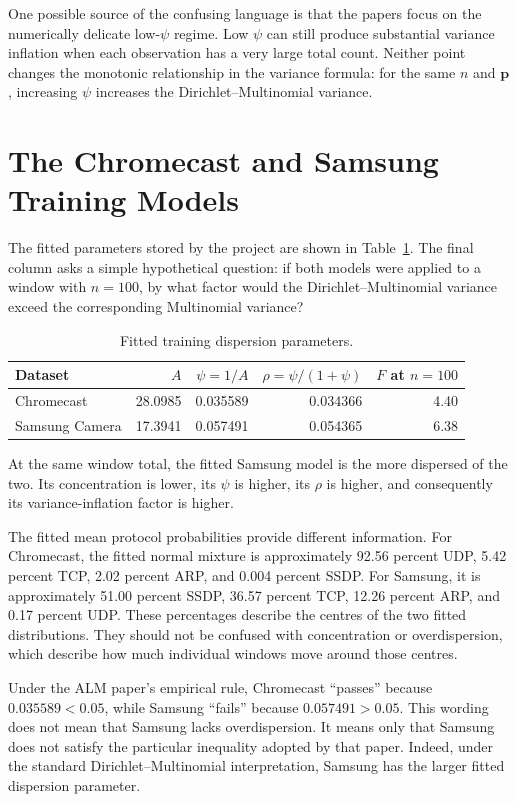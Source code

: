 \documentclass[11pt,a4paper]{article}
\begin{document}
One possible source of the confusing language is that the papers focus on the
numerically delicate low-$\psi$ regime.  Low $\psi$ can still produce
substantial variance inflation when each observation has a very large total
count.  Neither point changes the monotonic relationship in the variance
formula: for the same $n$ and $\mathbf{p}$, increasing $\psi$ increases the
Dirichlet--Multinomial variance.

\section{The Chromecast and Samsung Training Models}

The fitted parameters stored by the project are shown in
Table~\ref{tab:training-models}.  The final column asks a simple hypothetical
question: if both models were applied to a window with $n=100$, by what factor
would the Dirichlet--Multinomial variance exceed the corresponding
Multinomial variance?

\begin{table}[htbp]
\centering
\caption{Fitted training dispersion parameters.}
\label{tab:training-models}
\begin{tabular}{lrrrr}
\toprule
Dataset & $A$ & $\psi=1/A$ & $\rho=\psi/(1+\psi)$ & $F$ at $n=100$ \\
\midrule
Chromecast & 28.0985 & 0.035589 & 0.034366 & 4.40 \\
Samsung Camera & 17.3941 & 0.057491 & 0.054365 & 6.38 \\
\bottomrule
\end{tabular}
\end{table}

At the same window total, the fitted Samsung model is the more dispersed of
the two.  Its concentration is lower, its $\psi$ is higher, its $\rho$ is
higher, and consequently its variance-inflation factor is higher.

The fitted mean protocol probabilities provide different information.  For
Chromecast, the fitted normal mixture is approximately 92.56 percent UDP,
5.42 percent TCP, 2.02 percent ARP, and 0.004 percent SSDP.  For Samsung, it is
approximately 51.00 percent SSDP, 36.57 percent TCP, 12.26 percent ARP, and
0.17 percent UDP.  These percentages describe the centres of the two fitted
distributions.  They should not be confused with concentration or
overdispersion, which describe how much individual windows move around those
centres.

Under the ALM paper's empirical rule, Chromecast ``passes'' because
$0.035589<0.05$, while Samsung ``fails'' because $0.057491>0.05$.  This wording
does not mean that Samsung lacks overdispersion.  It means only that Samsung
does not satisfy the particular inequality adopted by that paper.  Indeed,
under the standard Dirichlet--Multinomial interpretation, Samsung has the
larger fitted dispersion parameter.
\end{document}
